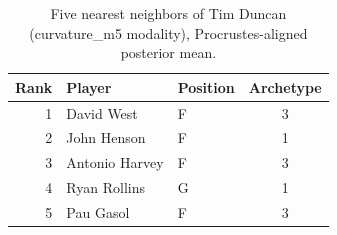 \begin{table}[htbp]
  \centering\small
  \begin{tabular}{rllc}
    \toprule
    Rank & Player & Position & Archetype \\
    \midrule
    1 & David West & F & 3 \\
    2 & John Henson & F & 1 \\
    3 & Antonio Harvey & F & 3 \\
    4 & Ryan Rollins & G & 1 \\
    5 & Pau Gasol & F & 3 \\
    \bottomrule
  \end{tabular}
  \caption{Five nearest neighbors of Tim Duncan (curvature_m5 modality), Procrustes-aligned posterior mean.}
  \label{tab:Tim_Duncan_neighbors_curvature_m5}
\end{table}

